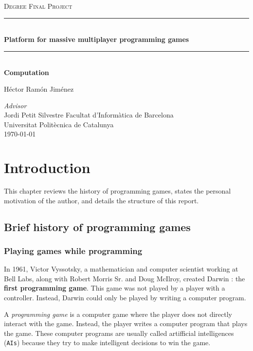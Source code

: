 \documentclass[a4paper,11pt,titlepage,abstract,numbers=noenddot,automark,mnsy,intlimits,rgb,dvipsnames]{report}
\begin{document}
\begin{titlepage}
\begin{center}
\textsc{\Large Degree Final Project}
\\[1.5cm]
\rule{\linewidth}{0.5mm}
\\[0.4cm]
{\huge
\bfseries
Platform for massive multiplayer programming games
\\[0.4cm]
}
\rule{\linewidth}{0.5mm}
\\[0.3cm]
{\bfseries
Computation
}
\\[2.5cm]
\begin{center}
\large
Héctor Ramón Jiménez
\end{center}
{\small \emph{Advisor}}\\Jordi Petit Silvestre
\vfill
{\large
Facultat d'Informàtica de Barcelona\\\small Universitat Politècnica de Catalunya
}
\\[0.5cm]
{\large
\today
}
\end{center}
\end{titlepage}
\clearpage
\begin{abstract}
...
\end{abstract}
\clearpage
\tableofcontents
\clearpage
\chapter{Introduction}
This chapter reviews the history of programming games, states the
personal motivation of the author, and details the structure of this report.
\section{Brief history of programming games}
\subsection{Playing games while programming}
In 1961, Victor Vyssotsky, a mathematician and computer scientist working at Bell Labs, along with Robert Morris Sr. and 
Doug McIlroy, created Darwin \cite{darwin}: the \textbf{first programming game}. This game was not played by a player with a controller.
Instead, Darwin could only be played by writing a computer program.

A \emph{programming game} is a computer game where the player does not directly interact with the game. Instead, the
player writes a computer program that plays the game. These computer programs are usually called artifficial
intelligences (\texttt{AIs}) because they try to make intelligent decisions to win the game.
\end{document}
